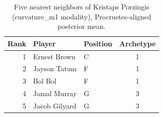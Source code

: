 \begin{table}[htbp]
  \centering\small
  \begin{tabular}{rllc}
    \toprule
    Rank & Player & Position & Archetype \\
    \midrule
    1 & Ernest Brown & C & 1 \\
    2 & Jayson Tatum & F & 1 \\
    3 & Bol Bol & F & 1 \\
    4 & Jamal Murray & G & 3 \\
    5 & Jacob Gilyard & G & 3 \\
    \bottomrule
  \end{tabular}
  \caption{Five nearest neighbors of Kristaps Porzingis (curvature_m1 modality), Procrustes-aligned posterior mean.}
  \label{tab:Kristaps_Porzingis_neighbors_curvature_m1}
\end{table}

